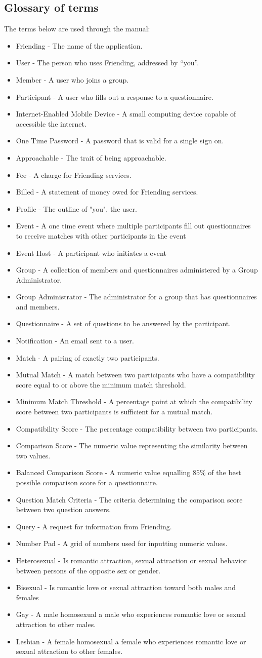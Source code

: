 \documentclass[a4paper,11pt,titlepage]{scrartcl}
\newcommand{\textapp}[1]{{\fontfamily{cmss}\selectfont#1}}
\newcommand{\Friending}{\textapp{Friending}}
\newcommand{\gterm}[2]{\item #1 - #2}
\begin{document}
\subsection{Glossary of terms}
\label{sec:glossary}
The terms below are used through the manual:

\begin{itemize}
\gterm{\Friending{}}{The name of the application.}
\gterm{User}{The person who uses \Friending{}, addressed by “you”.}
\gterm{Member}{A user who joins a group.}
\gterm{Participant}{A user who fills out a response to a questionnaire.}

\gterm{Internet-Enabled Mobile Device}{A small computing device capable of accessible the internet.}
\gterm{One Time Password}{A password that is valid for a single sign on.}
\gterm{Approachable}{The trait of being approachable.}

\gterm{Fee}{A charge for \Friending{} services.}
\gterm{Billed}{A statement of money owed for \Friending{} services.}

\gterm{Profile}{The outline of "you", the user.}
\gterm{Event}{A one time event where multiple participants fill out questionnaires to receive matches with other participants in the event}
\gterm{Event Host}{A participant who initiates a event}
\gterm{Group}{A collection of members and questionnaires administered by a Group Administrator.}
\gterm{Group Administrator}{The administrator for a group that has questionnaires and members.}
\gterm{Questionnaire}{A set of questions to be answered by the participant.}
\gterm{Notification}{An email sent to a user.}

\gterm{Match}{A pairing of exactly two participants.}
\gterm{Mutual Match}{A match between two participants who have a compatibility score equal to or above the minimum match threshold.} 
\gterm{Minimum Match Threshold}{A percentage point at which the compatibility score between two participants is sufficient for a mutual match.}
\gterm{Compatibility Score}{The percentage compatibility between two participants.}
\gterm{Comparison Score}{The numeric value representing the similarity between two values.}
\gterm{Balanced Comparison Score}{A numeric value equalling $85\%$ of the best possible comparison score for a questionnaire.}
\gterm{Question Match Criteria}{The criteria determining the comparison score between two question answers.}

\gterm{Query}{A request for information from \Friending{}.}

\gterm{Number Pad}{A grid of numbers used for inputting numeric values.}

\gterm{Heterosexual}{Is romantic attraction, sexual attraction or sexual behavior between persons of the opposite sex or gender.}
\gterm{Bisexual}{Is romantic love or sexual attraction toward both males and females}
\gterm{Gay}{A male homosexual a male who experiences romantic love or sexual attraction to other males.}
\gterm{Lesbian}{A female homosexual a female who experiences romantic love or sexual attraction to other females.}
\end{itemize}
\end{document}
